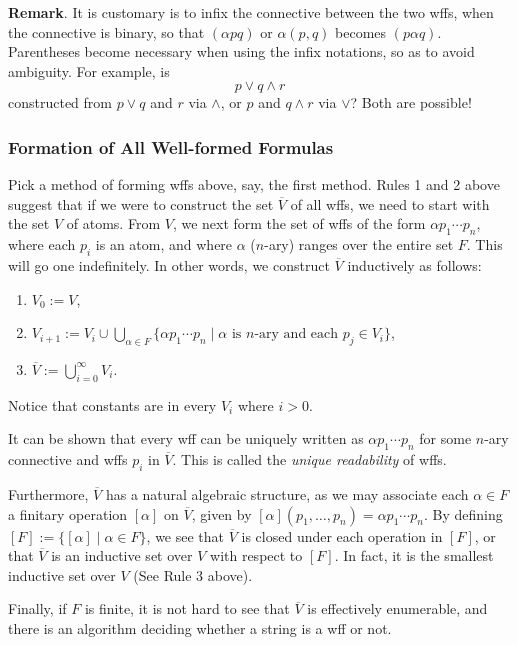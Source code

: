 \documentclass[12pt]{article}
\begin{document}
\textbf{Remark}.  It is customary is to infix the connective between the two wffs, when the connective is binary, so that $(\alpha p q)$ or $\alpha(p,q)$ becomes $(p \alpha q)$.  Parentheses become necessary when using the infix notations, so as to avoid ambiguity.  For example, is $$p \vee q \wedge r$$
constructed from $p\vee q$ and $r$ via $\wedge$, or $p$ and $q\wedge r$ via $\vee$?  Both are possible!

\subsubsection*{Formation of All Well-formed Formulas}

Pick a method of forming wffs above, say, the first method.  Rules 1 and 2 above suggest that if we were to construct the set $\overline{V}$ of all wffs, we need to start with the set $V$ of atoms.  From $V$, we next form the set of wffs of the form $\alpha p_1 \cdots p_n$, where each $p_i$ is an atom, and where $\alpha$ ($n$-ary) ranges over the entire set $F$.  This will go one indefinitely.  In other words, we construct $\overline{V}$ inductively as follows:
\begin{enumerate}
\item $V_0:=V$,
\item $V_{i+1}:=V_i \cup \bigcup_{\alpha\in F} \lbrace \alpha p_1\cdots p_n \mid \alpha\mbox{ is }n\mbox{-ary and each }p_j\in V_i\rbrace$,
\item $\overline{V}:=\bigcup_{i=0}^{\infty} V_i$.
\end{enumerate}
Notice that constants are in every $V_i$ where $i>0$.

It can be shown that every wff can be uniquely written as $\alpha p_1 \cdots p_n$ for some $n$-ary connective and wffs $p_i$ in $\overline{V}$.  This is called the \emph{unique readability} of wffs.

Furthermore, $\overline{V}$ has a natural algebraic structure, as we may associate each $\alpha \in F$ a finitary operation $[\alpha]$ on $\overline{V}$, given by $[\alpha](p_1,\ldots, p_n) = \alpha p_1 \cdots p_n$.  By defining $[F]:=\lbrace [\alpha] \mid \alpha \in F\rbrace$, we see that $\overline{V}$ is closed under each operation in $[F]$, or that $\overline{V}$ is an inductive set over $V$ with respect to $[F]$.  In fact, it is the smallest inductive set over $V$ (See Rule 3 above).

Finally, if $F$ is finite, it is not hard to see that $\overline{V}$ is effectively enumerable, and there is an algorithm deciding whether a string is a wff or not.
\end{document}
